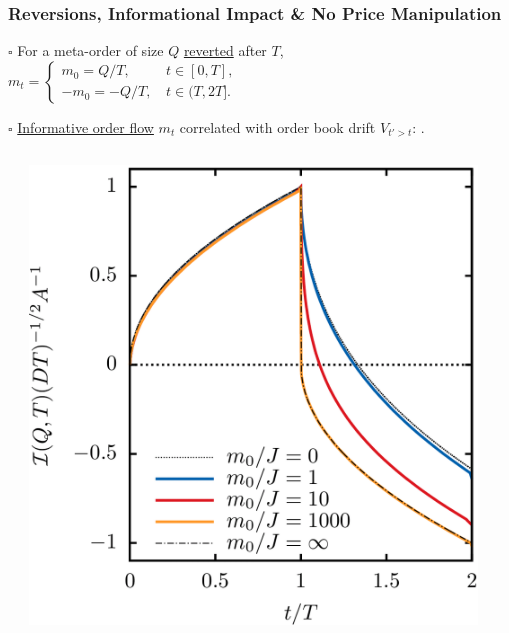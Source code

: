\documentclass{beamer}
\begin{document}
\begin{frame}
\frametitle{Reversions, Informational Impact \& No Price Manipulation}
{
\footnotesize{

$\square$ For a meta-order of size $Q$ \underline{reverted} after $T$,
$
m_t = \begin{cases}
 m_0 = Q/T, \, &t\in[0,T],\\
 -m_0 = -Q/T, \, &t\in (T,2T].
\end{cases}
$

$\square$ \underline{Informative order flow} $m_t$ correlated with order book drift $V_{t'>t}$: \textit{\color{blue}{permanent impact}}.

\begin{columns}
\begin{column}{0.05\textwidth}  %
\end{column}
\begin{column}{0.45\textwidth}
    \begin{center}
     \includegraphics[width=0.93\textwidth,height=.35\textheight]{reversion}
    \end{center}

\end{column}
\end{columns}}}
\end{frame}
\end{document}
